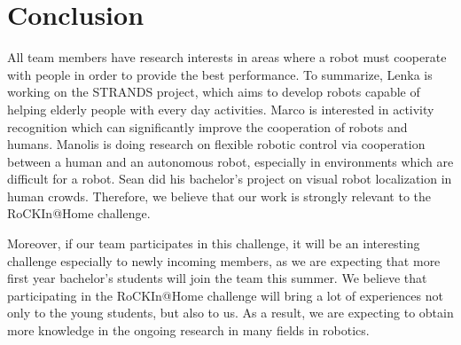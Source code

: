 \documentclass[conference]{IEEEtran}
\begin{document}

\section{Conclusion}
All team members have research interests in areas where a robot must cooperate with people in order to provide the best performance. To summarize, Lenka is working on the STRANDS project, which aims to develop robots capable of helping elderly people with every day activities. Marco is interested in activity recognition which can significantly improve the cooperation of robots and humans. Manolis is doing research on flexible robotic control via cooperation between a human and an autonomous robot, especially in environments which are difficult for a robot. Sean did his bachelor's project on visual robot localization in human crowds. Therefore, we believe that our work is strongly relevant to the RoCKIn@Home challenge.

Moreover, if our team participates in this challenge, it will be an interesting challenge especially to newly incoming members, as we are expecting that more first year bachelor's students will join the team this summer. We believe that participating in the RoCKIn@Home challenge will bring a lot of experiences not only to the young students, but also to us. As a result, we are expecting to obtain more knowledge in the ongoing research in many fields in robotics.








\end{document}
